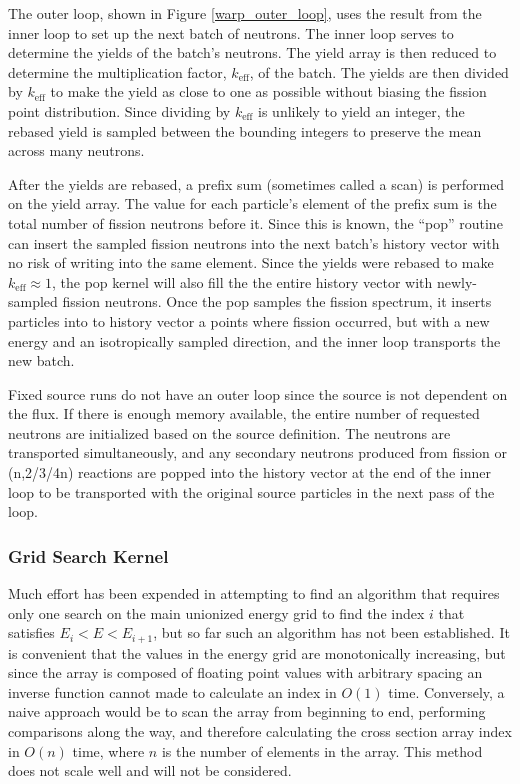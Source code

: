 The outer loop, shown in Figure \ref{warp_outer_loop}, uses the result from the inner loop to set up the next batch of neutrons.  The inner loop serves to determine the yields of the batch's neutrons.  The yield array is then reduced to determine the multiplication factor, $k_\mathrm{eff}$, of the batch. The yields are then divided by $k_\mathrm{eff}$ to make the yield as close to one as possible without biasing the fission point distribution.  Since dividing by $k_\mathrm{eff}$ is unlikely to yield an integer, the rebased yield is sampled between the bounding integers to preserve the mean across many neutrons.  
 
After the yields are rebased, a prefix sum (sometimes called a scan) %
 is performed on the yield array.  The value for each particle's element of the prefix sum is the total number of fission neutrons before it.  Since this is known, the ``pop'' routine can insert the sampled fission neutrons into the next batch's history vector with no risk of writing into the same element.  Since the yields were rebased to make $k_\mathrm{eff}\approx1$, the pop kernel will also fill the the entire history vector with newly-sampled fission neutrons.  Once the pop samples the fission spectrum, it inserts particles into to history vector a points where fission occurred, but with a new energy and an isotropically sampled direction, and the inner loop transports the new batch. %

Fixed source runs do not have an outer loop since the source is not dependent on the flux.  If there is enough memory available, the entire number of requested neutrons are initialized based on the source definition.  The neutrons are transported simultaneously, and any secondary neutrons produced from fission or (n,2/3/4n) reactions are popped into the history vector at the end of the inner loop to be transported with the original source particles in the next pass of the loop.

\subsubsection{Grid Search Kernel}

Much effort has been expended in attempting to find an algorithm that requires only one search on the main unionized energy grid to find the index $i$ that satisfies $E_i<E<E_{i+1}$, but so far such an algorithm has not been established.  It is convenient that the values in the energy grid are monotonically increasing, but since the array is composed of floating point values with arbitrary spacing an inverse function cannot made to calculate an index in $O(1)$ time.  Conversely, a naive approach would be to scan the array from beginning to end, performing comparisons along the way, and therefore calculating the cross section array index in $O(n)$ time, where $n$ is the number of elements in the array.  This method does not scale well and will not be considered.  

